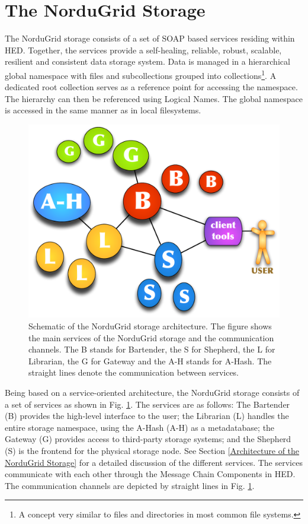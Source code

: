\documentclass[final]{ieee}
\begin{document}
\section{The NorduGrid Storage}
\label{The NorduGrid Storage}

The NorduGrid storage consists of a set of SOAP based services residing
within HED. Together, the services provide a self-healing, reliable, robust,
scalable, resilient and consistent data storage system. Data is
managed in a hierarchical global namespace with files and
subcollections grouped into collections\footnote{A concept very
  similar to files and directories in most common file systems.}.  A
dedicated root collection serves as a reference point for accessing the namespace. The hierarchy can then be
referenced using Logical Names. The global namespace is accessed
in the same manner as in local filesystems.

\begin{figure}
  \begin{center}
    \includegraphics[width=0.8\columnwidth]{arc1-storage-services-with-gateway.pdf}
  \end{center}
  \caption{Schematic of the NorduGrid storage architecture. The figure shows
    the main services of the NorduGrid storage and the communication channels. The B stands for Bartender, the S for Shepherd, the L for Librarian, the G for Gateway and the A-H stands for A-Hash. The straight lines denote the communication between services.}
  \label{fig:arc1_storage_service}
\end{figure}


Being based on a service-oriented architecture, the NorduGrid storage consists of a set of services as shown in Fig.
\ref{fig:arc1_storage_service}. The services are as follows: The Bartender (B)
provides the high-level interface to the user; the Librarian (L)
handles the entire storage namespace, using the A-Hash (A-H) as a metadatabase; the
Gateway (G) provides access to third-party storage systems; and
the Shepherd (S) is the frontend for the physical storage node. 
See Section \ref{Architecture of the NorduGrid Storage} for a detailed
discussion of the different services.   
The services communicate with each other through the
Message Chain Components in HED. The communication channels are
depicted by straight lines in Fig. \ref{fig:arc1_storage_service}.
\end{document}
